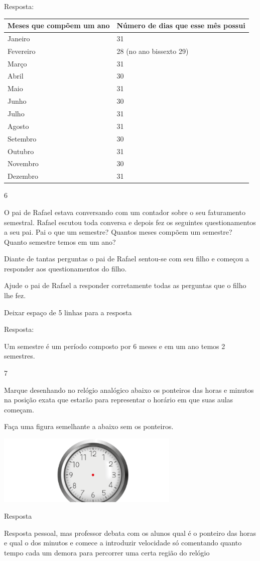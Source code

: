 Resposta:

\begin{longtable}[]{@{}ll@{}}
\toprule
Meses que compõem um ano & Número de dias que esse mês
possui\tabularnewline
\midrule
\endhead
Janeiro & 31\tabularnewline
Fevereiro & 28 (no ano bissexto 29)\tabularnewline
Março & 31\tabularnewline
Abril & 30\tabularnewline
Maio & 31\tabularnewline
Junho & 30\tabularnewline
Julho & 31\tabularnewline
Agosto & 31\tabularnewline
Setembro & 30\tabularnewline
Outubro & 31\tabularnewline
Novembro & 30\tabularnewline
Dezembro & 31\tabularnewline
\bottomrule
\end{longtable}

\num{6}

O pai de Rafael estava conversando com um contador sobre o seu
faturamento semestral. Rafael escutou toda conversa e depois fez os
seguintes questionamentos a seu pai. Pai o que um semestre? Quantos
meses compõem um semestre? Quanto semestre temos em um ano?

Diante de tantas perguntas o pai de Rafael sentou-se com seu filho e
começou a responder aos questionamentos do filho.

Ajude o pai de Rafael a responder corretamente todas as perguntas que o
filho lhe fez.

Deixar espaço de 5 linhas para a resposta

Resposta:

Um semestre é um período composto por 6 meses e em um ano temos 2
semestres.

\num{7}

Marque desenhando no relógio analógico abaixo os ponteiros das horas e
minutos na posição exata que estarão para representar o horário em que
suas aulas começam.

Faça uma figura semelhante a abaixo sem os ponteiros.

\includegraphics[width=3.42530in,height=1.30845in]{media/image48.png}

Resposta

Resposta pessoal, mas professor debata com os alunos qual é o ponteiro
das horas e qual o dos minutos e comece a introduzir velocidade só
comentando quanto tempo cada um demora para percorrer uma certa região
do relógio

